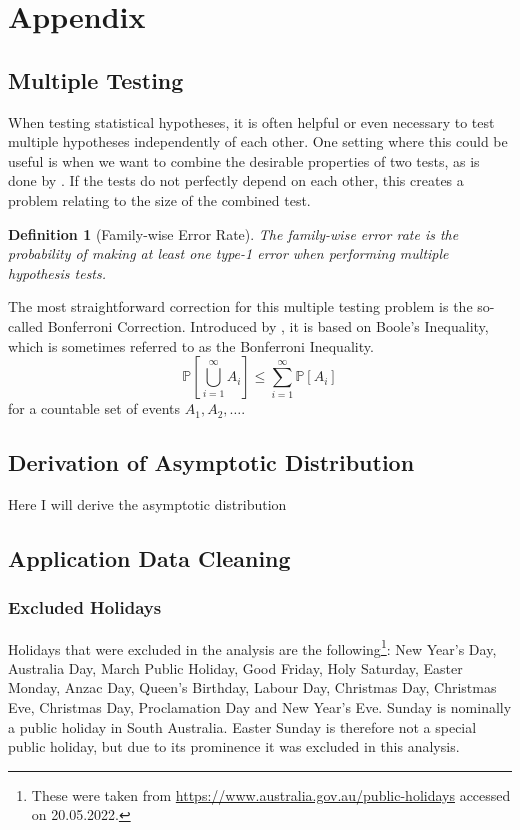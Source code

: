 \documentclass[12pt, a4paper]{article}
\theoremstyle{MAstyle} \newtheorem{assumption}{Assumption}[section]
\theoremstyle{MAstyle} \newtheorem{definition}{Definition}[section]
\theoremstyle{MAstyle} \newtheorem{theorem}{Theorem}[section]
\begin{document}
	\newpage
	\cleardoublepage
	\setcounter{page}{1}
	\section{Appendix}
	
		\subsection{Multiple Testing}\label{Multiple_Testing}
			When testing statistical hypotheses, it is often helpful or even necessary to test multiple hypotheses independently of each other. One setting where this could be useful is when we want to combine the desirable properties of two tests, as is done by \cite{bugni_permutation_2021}. If the tests do not perfectly depend on each other, this creates a problem relating to the size of the combined test.
			
			\begin{definition}[Family-wise Error Rate]
				The family-wise error rate is the probability of making at least one type-1 error when performing multiple hypothesis tests.
			\end{definition}
		
				The most straightforward correction for this multiple testing problem is the so-called Bonferroni Correction. Introduced by \cite{dunn_multiple_1961}, it is based on Boole's Inequality, which is sometimes referred to as the Bonferroni Inequality.
				\begin{equation}
						\mathbb{P}\left[\bigcup_{i = 1}^{\infty} A_i\right] \leq \sum_{i = 1}^{\infty} \mathbb{P}\left[A_i\right]
					\end{equation}
				for a countable set of events $A_1, A_2, \dots$.
		
		\subsection{Derivation of Asymptotic Distribution}\label{asymp_deriv}
			Here I will derive the asymptotic distribution
			
		\subsection{Application Data Cleaning}\label{Application_Appendix}
			\subsubsection{Excluded Holidays}
			Holidays that were excluded in the analysis are the following\footnote{These were taken from \url{https://www.australia.gov.au/public-holidays} accessed on 20.05.2022.}: New Year's Day, Australia Day, March Public Holiday, Good Friday, Holy Saturday, Easter Monday, Anzac Day, Queen's Birthday, Labour Day, Christmas Day, Christmas Eve, Christmas Day, Proclamation Day and New Year's Eve. Sunday is nominally a public holiday in South Australia. Easter Sunday is therefore not a special public holiday, but due to its prominence it was excluded in this analysis.
			
\end{document}
